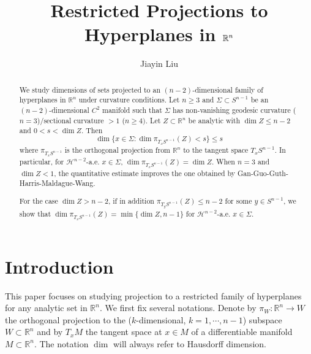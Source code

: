 \documentclass[11pt,a4paper,reqno]{amsart}
\author{Jiayin Liu}
\title[Restricted Projections to Hyperplanes in $\mathbb{R}^n$]{Restricted Projections to Hyperplanes in $\R^n$}
\newcommand{\R}{\mathbb{R}}
\newcommand{\1}{\mathbf{1}}
\numberwithin{equation}{section}
\theoremstyle{plain}
\theoremstyle{definition}
\theoremstyle{remark}
\begin{document}
\begin{abstract}
We study dimensions of sets projected to an $(n-2)$-dimensional family of hyperplanes in $\mathbb{R}^n$ under curvature conditions.
Let $n\ge 3$ and $\Sigma \subset S^{n-1}$ be an $(n-2)$-dimensional $C^2$ manifold such that $\Sigma$ has non-vanishing geodesic curvature ($n=3$)/sectional curvature $>1$ ($n \ge 4)$. Let $Z \subset \mathbb{R}^{n}$ be analytic with $\dim Z  \le n-2$ and $0 < s < \dim Z$. Then
\begin{equation*}
  \dim \{x \in \Sigma : \dim \pi_{T_xS^{n-1}}(Z) < s\} \le s
\end{equation*}
where $\pi_{T_xS^{n-1}}$ is the orthogonal projection from $\mathbb{R}^n$ to the tangent space $T_xS^{n-1}$.
In particular,
for $\mathcal{H}^{n-2}$-a.e. $x \in \Sigma$, $\dim \pi_{T_xS^{n-1}}(Z) = \dim Z$. When $n=3$ and $\dim Z < 1$, the quantitative estimate improves the one obtained by Gan-Guo-Guth-Harris-Maldague-Wang.

For the case $\dim Z > n-2$, if in addition $\pi_{T_yS^{n-1}}(Z) \le n-2$ for some $y \in S^{n-1}$, we show that
$\dim \pi_{T_xS^{n-1}}(Z) = \min\{\dim Z, n-1\}$ for $\mathcal{H}^{n-2}$-a.e. $x \in \Sigma$.
\end{abstract}

\maketitle
\tableofcontents

\section{Introduction}
This paper focuses on studying projection to a restricted family of
hyperplanes for any analytic set in $\R^n$. We first fix several notations.
Denote by $\pi_W: \R^n \to W$ the orthogonal projection to the ($k$-dimensional, $k=1, \cdots, n-1$) subspace $W \subset \R^n$ and by $T_x M$ the tangent space at $x \in M$ of a differentiable manifold $M \subset\R^n $. The notation $\dim$ will always refer to Hausdorff dimension.
\end{document}
